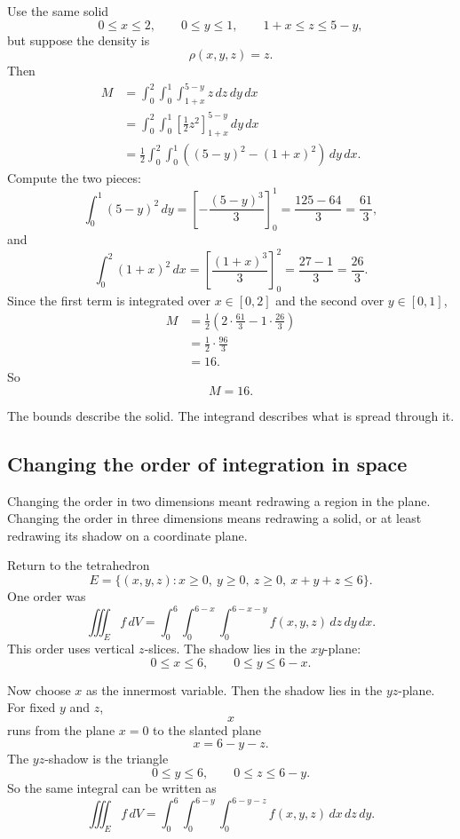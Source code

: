 \begin{example}
Use the same solid
\[
    0\le x\le2,\qquad 0\le y\le1,\qquad 1+x\le z\le 5-y,
\]
but suppose the density is
\[
    \rho(x,y,z)=z.
\]
Then
\[
\begin{aligned}
M
&=
\int_0^2\int_0^1\int_{1+x}^{5-y} z\,dz\,dy\,dx\\
&=
\int_0^2\int_0^1
\left[
\frac12 z^2
\right]_{1+x}^{5-y}
\,dy\,dx\\
&=
\frac12
\int_0^2\int_0^1
\left((5-y)^2-(1+x)^2\right)\,dy\,dx.
\end{aligned}
\]
Compute the two pieces:
\[
    \int_0^1(5-y)^2\,dy
    =
    \left[-\frac{(5-y)^3}{3}\right]_0^1
    =
    \frac{125-64}{3}
    =
    \frac{61}{3},
\]
and
\[
    \int_0^2(1+x)^2\,dx
    =
    \left[\frac{(1+x)^3}{3}\right]_0^2
    =
    \frac{27-1}{3}
    =
    \frac{26}{3}.
\]
Since the first term is integrated over \(x\in[0,2]\) and the second over
\(y\in[0,1]\),
\[
\begin{aligned}
M
&=
\frac12
\left(
2\cdot\frac{61}{3}
-
1\cdot\frac{26}{3}
\right)\\
&=
\frac12\cdot\frac{96}{3}\\
&=
16.
\end{aligned}
\]
So
\[
\boxed{
    M=16.
}
\]
\end{example}

The bounds describe the solid.  The integrand describes what is spread through it.

\subsection{Changing the order of integration in space}

Changing the order in two dimensions meant redrawing a region in the plane.  Changing
the order in three dimensions means redrawing a solid, or at least redrawing its shadow
on a coordinate plane.

Return to the tetrahedron
\[
    E=\{(x,y,z):x\ge0,\ y\ge0,\ z\ge0,\ x+y+z\le6\}.
\]
One order was
\[
\boxed{
\iiint_E f\,dV
=
\int_0^6\int_0^{6-x}\int_0^{6-x-y}
f(x,y,z)\,dz\,dy\,dx.
}
\]
This order uses vertical \(z\)-slices.  The shadow lies in the \(xy\)-plane:
\[
    0\le x\le6,\qquad 0\le y\le6-x.
\]

Now choose \(x\) as the innermost variable.  Then the shadow lies in the \(yz\)-plane.
For fixed \(y\) and \(z\),
\[
    x
\]
runs from the plane \(x=0\) to the slanted plane
\[
    x=6-y-z.
\]
The \(yz\)-shadow is the triangle
\[
    0\le y\le6,\qquad 0\le z\le6-y.
\]
So the same integral can be written as
\[
\boxed{
\iiint_E f\,dV
=
\int_0^6\int_0^{6-y}\int_0^{6-y-z}
f(x,y,z)\,dx\,dz\,dy.
}
\]

